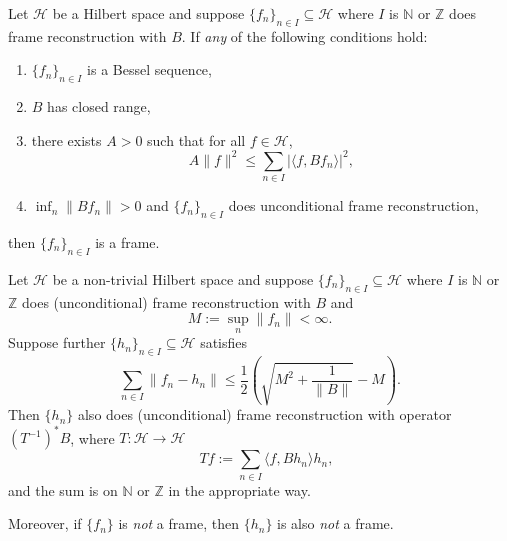 \documentclass[10pt,a4paper]{amsart}
\newcommand{\Hcal}{\mathcal{H}} %
\begin{document}
\begin{cor}\label{almostframecor}
Let $\Hcal$ be a Hilbert space and suppose $\{f_{n}\}_{n\in I}\subseteq \Hcal$ where $I$ is $\mathbb{N}$ or $\mathbb{Z}$ does frame reconstruction with $B$. If \emph{any} of the following conditions hold:
\begin{enumerate}
\item $\{f_n\}_{n\in I}$ is a Bessel sequence,
\item \(B\) has closed range,
\item there exists $A>0$ such that for all $f\in \Hcal$,
    \[
    A\|f\|^2 \leq \sum_{n\in I} |\langle f, Bf_n \rangle|^2,
    \]
\item \(\inf_n \|B f_n\| > 0\) and $\{f_n\}_{n\in I}$ does unconditional frame reconstruction,
\end{enumerate}
then $\{f_n\}_{n\in I}$ is a frame.
\end{cor}

\begin{thm}
Let $\Hcal$ be a non-trivial Hilbert space and suppose $\{f_{n}\}_{n\in I}\subseteq \Hcal$ where $I$ is $\mathbb{N}$ or $\mathbb{Z}$ does (unconditional) frame reconstruction with $B$ and
\[
M := \sup_n \|f_n\| < \infty.
\]
Suppose further \(\{h_n\}_{n\in I}\subseteq \mathcal{H}\) satisfies
\[
\sum_{n\in I} \|f_n - h_n\| \leq \frac{1}{2}\left(\sqrt{M^2 + \frac{1}{\|B\|}} - M \right).
\]
Then \(\{h_n\}\) also does (unconditional) frame reconstruction with operator \newline \((T^{-1})^{*} B\), where
$
T : \mathcal{H} \to \mathcal{H}$ $$ \quad T f := \sum_{n\in I} \langle f, Bh_n \rangle h_n,
$$
and the sum is on $\mathbb{N}$ or $\mathbb{Z}$ in the appropriate way.

Moreover, if \(\{f_n\}\) is \emph{not} a frame, then \(\{h_n\}\) is also \emph{not} a frame.
\end{thm}
\end{document}
